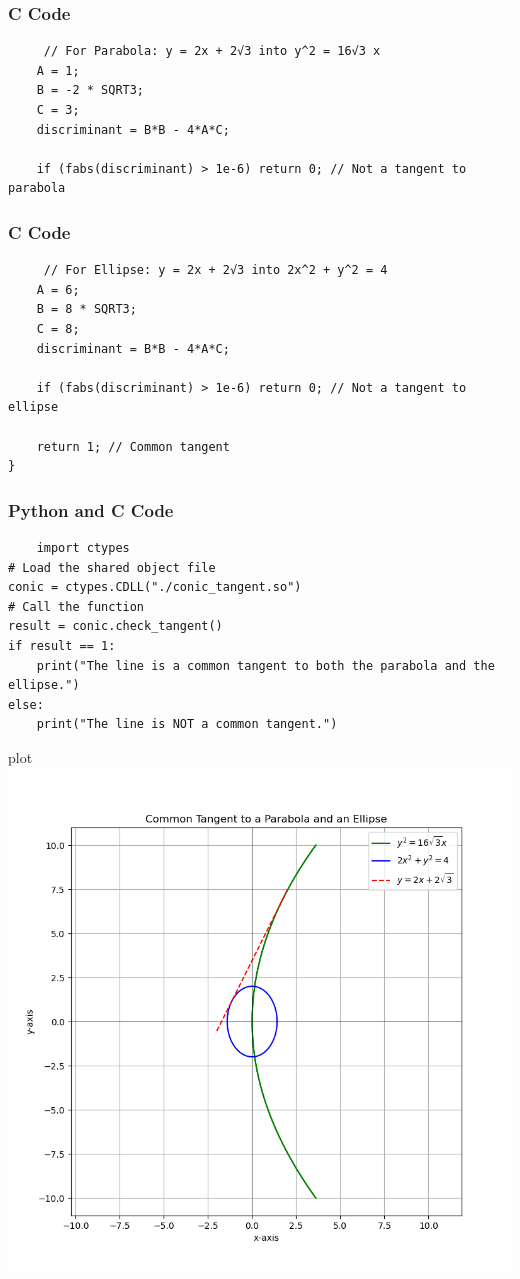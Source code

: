 \documentclass{beamer}
\begin{document}
\begin{frame}[fragile]
\frametitle{ C Code}
\begin{lstlisting}
     // For Parabola: y = 2x + 2√3 into y^2 = 16√3 x
    A = 1;
    B = -2 * SQRT3;
    C = 3;
    discriminant = B*B - 4*A*C;

    if (fabs(discriminant) > 1e-6) return 0; // Not a tangent to parabola
\end{lstlisting}
\end{frame}
\begin{frame}[fragile]
\frametitle{ C Code}
\begin{lstlisting}
     // For Ellipse: y = 2x + 2√3 into 2x^2 + y^2 = 4
    A = 6;
    B = 8 * SQRT3;
    C = 8;
    discriminant = B*B - 4*A*C;

    if (fabs(discriminant) > 1e-6) return 0; // Not a tangent to ellipse

    return 1; // Common tangent
}
\end{lstlisting}
\end{frame}
\begin{frame}[fragile]
\frametitle{ Python and C Code}
\begin{lstlisting}
    import ctypes
# Load the shared object file
conic = ctypes.CDLL("./conic_tangent.so")
# Call the function
result = conic.check_tangent()
if result == 1:
    print("The line is a common tangent to both the parabola and the ellipse.")
else:
    print("The line is NOT a common tangent.")
\end{lstlisting}
\end{frame}
\begin{frame}{plot}
\centering
    \includegraphics[width=\columnwidth, height=0.8\textheight, keepaspectratio]{Figure_17.png}
   
\end{frame}
\end{document}

